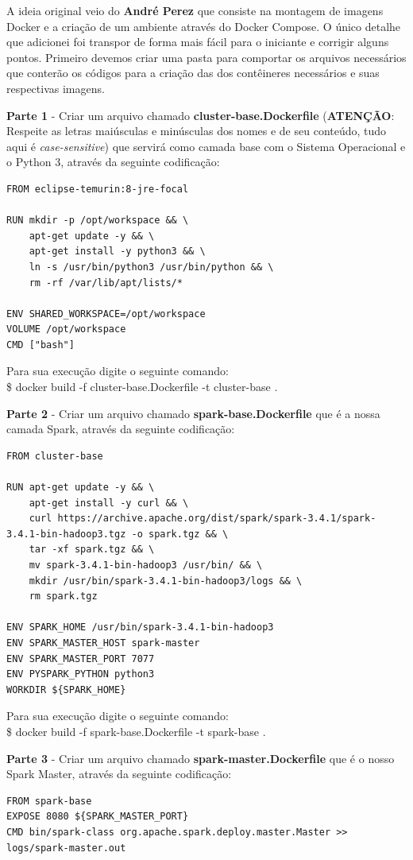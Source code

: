A ideia original veio do \textbf{André Perez} que consiste na montagem de imagens Docker e a criação de um ambiente através do Docker Compose. O único detalhe que adicionei foi transpor de forma mais fácil para o iniciante e corrigir alguns pontos. Primeiro devemos criar uma pasta para comportar os arquivos necessários que conterão os códigos para a criação das dos contêineres necessários e suas respectivas imagens.

\textbf{Parte 1} - Criar um arquivo chamado \textbf{cluster-base.Dockerfile} (\textbf{ATENÇÃO}: Respeite as letras maiúsculas e minúsculas dos nomes e de seu conteúdo, tudo aqui é \textit{case-sensitive}) que servirá como camada base com o Sistema Operacional e o Python 3, através da seguinte codificação:
\begin{lstlisting}[]
FROM eclipse-temurin:8-jre-focal

RUN mkdir -p /opt/workspace && \
    apt-get update -y && \
    apt-get install -y python3 && \
    ln -s /usr/bin/python3 /usr/bin/python && \
    rm -rf /var/lib/apt/lists/*

ENV SHARED_WORKSPACE=/opt/workspace
VOLUME /opt/workspace
CMD ["bash"]
\end{lstlisting}

Para sua execução digite o seguinte comando: \\
{\ttfamily\$ docker build -f cluster-base.Dockerfile -t cluster-base .}

\textbf{Parte 2} - Criar um arquivo chamado \textbf{spark-base.Dockerfile} que é a nossa camada Spark, através da seguinte codificação:
\begin{lstlisting}[]
FROM cluster-base

RUN apt-get update -y && \
    apt-get install -y curl && \
    curl https://archive.apache.org/dist/spark/spark-3.4.1/spark-3.4.1-bin-hadoop3.tgz -o spark.tgz && \
    tar -xf spark.tgz && \
    mv spark-3.4.1-bin-hadoop3 /usr/bin/ && \
    mkdir /usr/bin/spark-3.4.1-bin-hadoop3/logs && \
    rm spark.tgz

ENV SPARK_HOME /usr/bin/spark-3.4.1-bin-hadoop3
ENV SPARK_MASTER_HOST spark-master
ENV SPARK_MASTER_PORT 7077
ENV PYSPARK_PYTHON python3
WORKDIR ${SPARK_HOME}
\end{lstlisting}

Para sua execução digite o seguinte comando: \\
{\ttfamily\$ docker build -f spark-base.Dockerfile -t spark-base .}
 
\textbf{Parte 3} - Criar um arquivo chamado \textbf{spark-master.Dockerfile} que é o nosso Spark Master, através da seguinte codificação:
\begin{lstlisting}[]
FROM spark-base
EXPOSE 8080 ${SPARK_MASTER_PORT}
CMD bin/spark-class org.apache.spark.deploy.master.Master >> logs/spark-master.out
\end{lstlisting}

